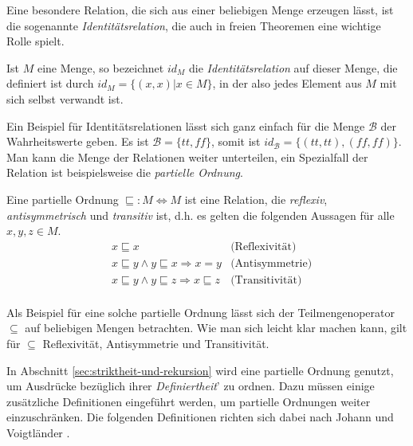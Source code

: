 Eine besondere Relation, die sich aus einer beliebigen Menge erzeugen lässt, ist die sogenannte \textit{Identitätsrelation}, die
auch in freien Theoremen eine wichtige Rolle spielt.

\begin{mydef}
Ist $M$ eine Menge, so bezeichnet $id_{M}$ die \textit{Identitätsrelation} auf dieser Menge, die definiert ist durch
$id_{M} = \{ (x, x) | x \in M \}$, in der also jedes Element aus $M$ mit sich selbst verwandt ist.
\end{mydef}

Ein Beispiel für Identitätsrelationen lässt sich ganz einfach für die Menge $\mathcal{B}$ der Wahrheitswerte geben. Es ist
$\mathcal{B} = \{ tt, ff \}$, somit ist $id_{\mathcal{B}} = \{ (tt, tt), (ff, ff) \}$.
Man kann die Menge der Relationen weiter unterteilen, ein Spezialfall der Relation ist beispielsweise die \textit{partielle Ordnung}.

\begin{mydef}
Eine partielle Ordnung $\sqsubseteq : M \Leftrightarrow M$ ist eine Relation, die \textit{reflexiv}, \textit{antisymmetrisch} und \textit{transitiv} ist, d.h. es gelten die folgenden Aussagen für alle $x, y, z \in M$.
\begin{align*}
& x \sqsubseteq x & \text{(Reflexivität)} \\
& x \sqsubseteq y \land y \sqsubseteq x \Rightarrow x = y & \text{(Antisymmetrie)} \\
& x \sqsubseteq y \land y \sqsubseteq z \Rightarrow x \sqsubseteq z & \text{(Transitivität)} \\
\end{align*}
\end{mydef}

Als Beispiel für eine solche partielle Ordnung lässt sich der Teilmengenoperator $\subseteq$ auf beliebigen Mengen betrachten.
Wie man sich leicht klar machen kann, gilt für $\subseteq$ Reflexivität, Antisymmetrie und Transitivität.

In Abschnitt \ref{sec:striktheit-und-rekursion} wird eine partielle Ordnung genutzt, um Ausdrücke bezüglich ihrer \textit{Definiertheit}'
zu ordnen. Dazu müssen einige zusätzliche Definitionen eingeführt werden,
um partielle Ordnungen weiter einzuschränken. Die folgenden
Definitionen richten sich dabei nach Johann und Voigtländer \cite{johann2006}.

